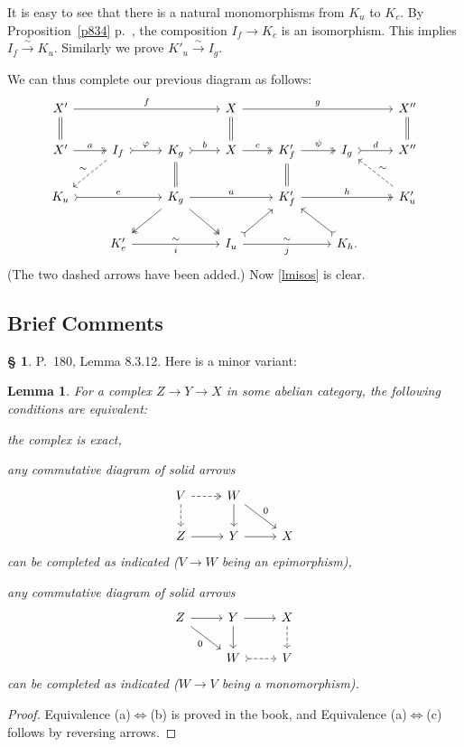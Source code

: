 \documentclass[12pt]{article}%
\newtheorem{lem}[thm]{Lemma}
\theoremstyle{remark}
\theoremstyle{definition}
\newtheorem{s}[thm]{\S}%
\newcommand{\nn}{\noindent}
\newcommand{\pp}{\varphi}
\newcommand{\ssi}{\Leftrightarrow}%
\newcommand{\xr}{\xrightarrow}
\begin{document}
It is easy to see that there is a natural monomorphisms from $K_u$ to $K_c$. By Proposition~\ref{p834} p.~\pageref{p834}, the composition $I_f\to K_c$ is an isomorphism. This implies $I_f\xr\sim K_u$. Similarly we prove $K'_u\xr\sim I_g$. 

We can thus complete our previous diagram as follows: 
$$
\begin{tikzcd}
X'\ar{rrr}{f}\ar[equal]{d}&&&X\ar[equal]{d}\ar{rrr}{g}&&&X''\ar[equal]{d}\\ 
X'\ar[two heads]{r}{a}&I_f\ar[dashed]{dl}[swap]{\sim}\ar[tail]{r}{\pp}&K_g\ar[equal]{d}\ar[tail]{r}{b}&X\ar[two heads]{r}{c}&K'_f\ar[equal]{d}\ar[two heads]{r}{\psi}&I_g\ar[tail]{r}{d}&X''\\ 
K_u\ar[tail]{rr}{e}&&K_g\ar[two heads]{dl}\ar[two heads]{dr}\ar{rr}{u}&&K'_f\ar[two heads]{rr}{h}&&K'_u\ar[dashed]{ul}[swap]{\sim}\\ 
&K'_e\ar{rr}{\sim}[swap]{i}&&I_u\ar[tail]{ur}\ar{rr}{\sim}[swap]{j}&&K_h.\ar[tail]{ul}
\end{tikzcd}
$$ 
(The two dashed arrows have been added.) Now \eqref{lmisos} is clear.


\subsection{Brief Comments}

\begin{s}
P.~180, Lemma 8.3.12. Here is a minor variant:

\begin{lem}\label{8312}
For a complex $Z\to Y\to X$ in some abelian category, the following conditions are equivalent:

\nn{\em(a)} the complex is exact,

\nn{\em(b)} any commutative diagram of solid arrows
$$
\begin{tikzcd}
V\ar[dashed]{d}\ar[dashed, two heads]{r}&W\ar{dr}{0}\ar{d}\\ 
Z\ar{r}&Y\ar{r}&X
\end{tikzcd}
$$ 
can be completed as indicated ($V\to W$ being an epimorphism),

\nn{\em(c)} any commutative diagram of solid arrows
$$
\begin{tikzcd}
Z\ar{dr}[swap]{0}\ar{r}&Y\ar{d}\ar{r}&X\ar[dashed]{d}\\ 
{}&W\ar[tail,dashed]{r}&V
\end{tikzcd}
$$ 
can be completed as indicated ($W\to V$ being a monomorphism).
\end{lem}

\begin{proof}
Equivalence (a)$\ssi$(b) is proved in the book, and Equivalence (a)$\ssi$(c) follows by reversing arrows.
\end{proof}
\end{s}
\end{document}
